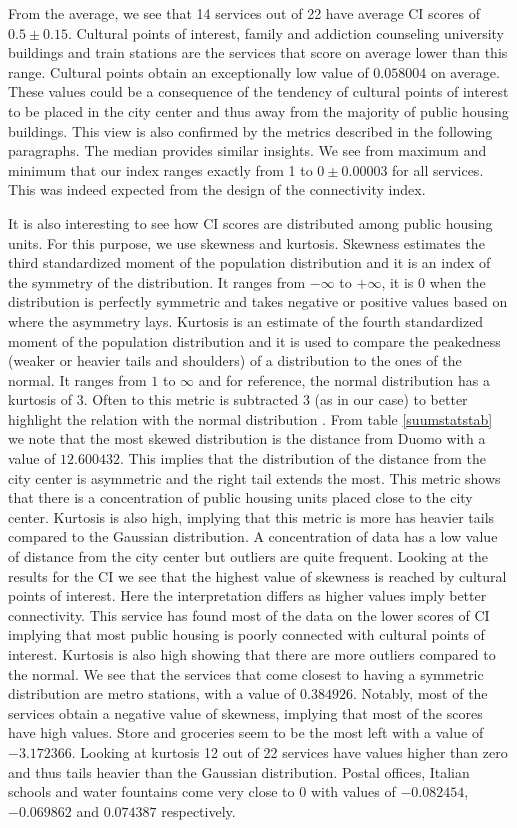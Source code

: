 \documentclass[12pt]{article}
\begin{document}
From the average, we see that 14 services out of 22 have average CI scores of $0.5\pm0.15$. Cultural points of interest, family and addiction counseling university buildings and train stations are the services that score on average lower than this range. Cultural points obtain an exceptionally low value of $0.058004$ on average. These values could be a consequence of the tendency of cultural points of interest to be placed in the city center and thus away from the majority of public housing buildings. This view is also confirmed by the metrics described in the following paragraphs. The median provides similar insights. We see from maximum and minimum that our index ranges exactly from 1 to $0\pm0.00003$ for all services. This was indeed expected from the design of the connectivity index.

It is also interesting to see how CI scores are distributed among public housing units. For this purpose, we use skewness and kurtosis. Skewness estimates the third standardized moment of the population distribution and it is an index of the symmetry of the distribution. It ranges from $-\infty$ to $+\infty$, it is $0$ when the distribution is perfectly symmetric and takes negative or positive values based on where the asymmetry lays. Kurtosis is an estimate of the fourth standardized moment of the population distribution and it is used to compare the peakedness (weaker or heavier tails and shoulders) of a distribution to the ones of the normal. It ranges from $1$ to $\infty$ and for reference, the normal distribution has a kurtosis of $3$. Often to this metric is subtracted 3 (as in our case) to better highlight the relation with the normal distribution  \parencite{ho_descriptive_2015}. From table \ref{suumstatstab} we note that the most skewed distribution is the distance from Duomo with a value of $12.600432$. This implies that the distribution of the distance from the city center is asymmetric and the right tail extends the most. This metric shows that there is a concentration of public housing units placed close to the city center. Kurtosis is also high, implying that this metric is more has heavier tails compared to the Gaussian distribution. A concentration of data has a low value of distance from the city center but outliers are quite frequent.  Looking at the results for the CI we see that the highest value of skewness is reached by cultural points of interest. Here the interpretation differs as higher values imply better connectivity. This service has found most of the data on the lower scores of CI implying that most public housing is poorly connected with cultural points of interest. Kurtosis is also high showing that there are more outliers compared to the normal. We see that the services that come closest to having a symmetric distribution are metro stations, with a value of $0.384926$. Notably, most of the services obtain a negative value of skewness, implying that most of the scores have high values. Store and groceries seem to be the most left with a value of $-3.172366$. Looking at kurtosis 12 out of 22 services have values higher than zero and thus tails heavier than the Gaussian distribution. Postal offices, Italian schools and water fountains come very close to 0 with values of $-0.082454$, $-0.069862$ and $0.074387$ respectively.
\end{document}
